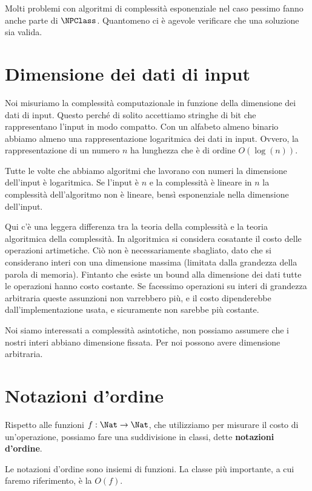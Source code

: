 Molti problemi con algoritmi di complessità esponenziale nel caso pessimo fanno anche parte di
$\NPClass$. Quantomeno ci è agevole verificare che una soluzione sia valida.

\section{Dimensione dei dati di input}

Noi misuriamo la complessità computazionale in funzione della dimensione dei dati di input. Questo
perché di solito accettiamo stringhe di bit che rappresentano l'input in modo compatto. Con un
alfabeto almeno binario abbiamo almeno una rappresentazione logaritmica dei dati in input. Ovvero,
la rappresentazione di un numero $n$ ha lunghezza che è di ordine $O(\log(n))$.

Tutte le volte che abbiamo algoritmi che lavorano con numeri la dimensione dell'input è
logaritmica. Se l'input è $n$ e la complessità è lineare in $n$ la complessità dell'algoritmo
non è lineare, bensì esponenziale nella dimensione dell'input.

Qui c'è una leggera differenza tra la teoria della complessità e la teoria algoritmica della
complessità. In algoritmica si considera cosatante il costo delle operazioni artimetiche. Ciò non è
necessariamente sbagliato, dato che si considerano interi con una dimensione massima (limitata dalla
grandezza della parola di memoria). Fintanto che esiste un bound alla dimensione dei dati tutte le
operazioni hanno costo costante. Se facessimo operazioni su interi di grandezza arbitraria queste
assunzioni non varrebbero più, e il costo dipenderebbe dall'implementazione usata, e sicuramente non
sarebbe più costante.

Noi siamo interessati a complessità asintotiche, non possiamo assumere che i nostri interi abbiano
dimensione fissata. Per noi possono avere dimensione arbitraria.

\section{Notazioni d'ordine}

Rispetto alle funzioni $f:\Nat \to \Nat$, che utilizziamo per misurare il costo di un'operazione,
possiamo fare una suddivisione in classi, dette \textbf{notazioni d'ordine}.

Le notazioni d'ordine sono insiemi di funzioni. La classe più importante, a cui faremo riferimento,
è la $O(f)$.

